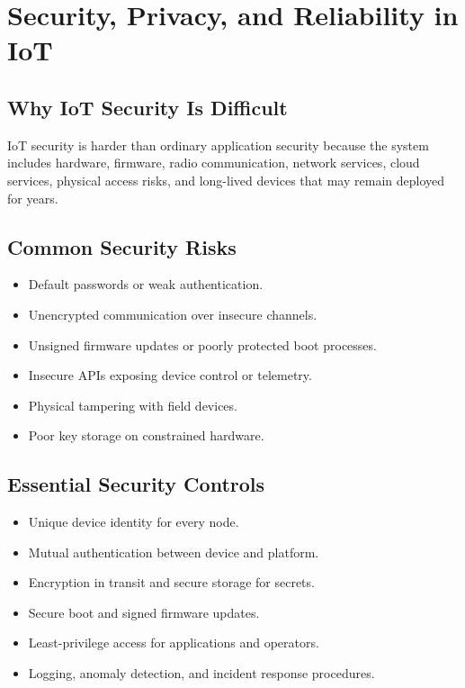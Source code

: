 \documentclass[11pt,a4paper]{article}
\begin{document}
\section{Security, Privacy, and Reliability in IoT}

\subsection{Why IoT Security Is Difficult}

\begin{alertbox}
IoT security is harder than ordinary application security because the system includes hardware, firmware, radio communication, network services, cloud services, physical access risks, and long-lived devices that may remain deployed for years.
\end{alertbox}

\subsection{Common Security Risks}

\begin{itemize}[leftmargin=*]
  \item Default passwords or weak authentication.
  \item Unencrypted communication over insecure channels.
  \item Unsigned firmware updates or poorly protected boot processes.
  \item Insecure APIs exposing device control or telemetry.
  \item Physical tampering with field devices.
  \item Poor key storage on constrained hardware.
\end{itemize}

\subsection{Essential Security Controls}

\begin{itemize}[leftmargin=*]
  \item Unique device identity for every node.
  \item Mutual authentication between device and platform.
  \item Encryption in transit and secure storage for secrets.
  \item Secure boot and signed firmware updates.
  \item Least-privilege access for applications and operators.
  \item Logging, anomaly detection, and incident response procedures.
\end{itemize}
\end{document}
